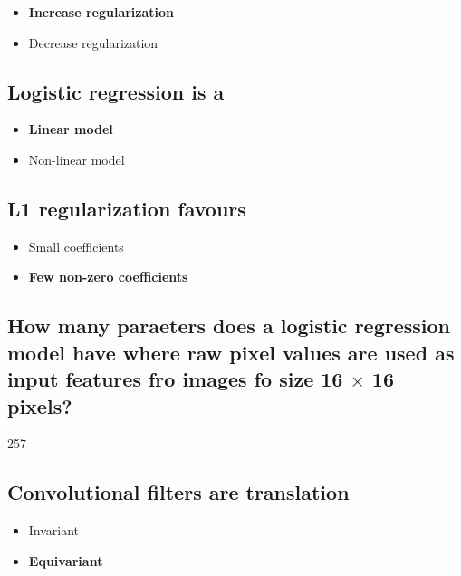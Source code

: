 \documentclass[11pt]{article}
\begin{document}
\begin{itemize}
    \item \textbf{Increase regularization}
    \item Decrease regularization
\end{itemize}

\subsection{Logistic regression is a}

\begin{itemize}
    \item \textbf{Linear model}
    \item Non-linear model
\end{itemize}

\subsection{L1 regularization favours}

\begin{itemize}
    \item Small coefficients
    \item \textbf{Few non-zero coefficients}
\end{itemize}

\subsection{How many paraeters does a logistic regression model have where raw pixel values are used as input features fro images fo size 16 $\times$ 16 pixels?}

257

\subsection{Convolutional filters are translation}

\begin{itemize}
    \item Invariant
    \item \textbf{Equivariant}
\end{itemize}

\printbibliography
{}
\end{document}
